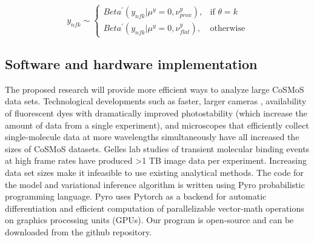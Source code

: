 \begin{equation*}
    y_{nfk} \sim
\begin{cases}
    Beta^{\prime}(y_{nfk}|\mu^y=0,\nu^y_{prox}),& \text{if } \theta = k\\
    Beta^{\prime}(y_{nfk}|\mu^y=0,\nu^y_{flat}),& \text{otherwise}
\end{cases}
\end{equation*}







\subsection{Software and hardware implementation}

The proposed research will provide more efficient ways to analyze large CoSMoS data sets. Technological developments such as faster, larger cameras \citep{Quan2011-cg}, availability of fluorescent dyes with dramatically improved photostability (which increase the amount of data from a single experiment), and microscopes that efficiently collect single-molecule data at more wavelengths simultaneously \citep{Friedman2006-kb} have all increased the sizes of CoSMoS datasets. Gelles lab studies of transient molecular binding events at high frame rates have produced >1 TB image data per experiment. Increasing data set sizes make it infeasible to use existing analytical methods. The code for the model and variational inference algorithm is written using Pyro probabilistic programming language. Pyro uses Pytorch as a backend for automatic differentiation and efficient computation of parallelizable vector-math operations on graphics processing units (GPUs). Our program is open-source and can be downloaded from the github repository.

